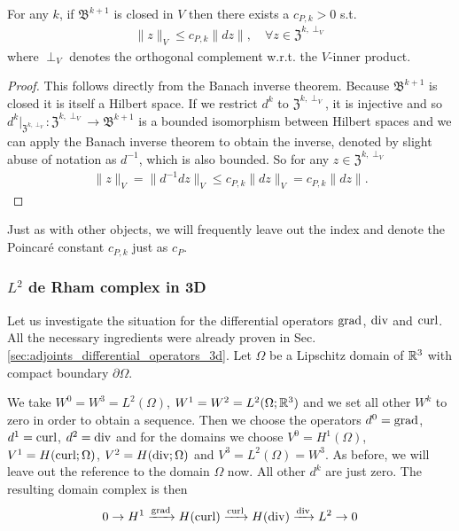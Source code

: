 \documentclass[../master_thesis.tex]{subfiles}
\begin{document}
\begin{theorem} \label{thm:poincare_inequality}
    For any $k$, if $\mathfrak{B}^{k+1}$ is closed in $V$ then there exists a 
    $c_{P,k}>0$ s.t. 
    \begin{align*}
        \lVert z \rVert _V \leq c_{P,k} \lVert dz \rVert, \quad \forall z \in \mathfrak{Z}^{k,\perp_V}
    \end{align*}
    where $\perp_V$ denotes the orthogonal complement w.r.t. the $V$-inner product.
\end{theorem}
\begin{proof}
    This follows directly from the Banach inverse theorem. Because $\mathfrak{B}^{k+1}$ is closed
    it is itself a Hilbert space. If we restrict $d^k$ to $\mathfrak{Z}^{k,\perp_V}$, it 
    is injective and so $d^k|_{\mathfrak{Z}^{k,\perp_V}}:\mathfrak{Z}^{k,\perp_V} 
    \rightarrow \mathfrak{B}^{k+1}$ is a bounded isomorphism between 
    Hilbert spaces and we can apply the Banach inverse theorem to obtain the inverse, 
    denoted by slight abuse of notation as $d^{-1}$, which is also bounded. So 
    for any $z \in \mathfrak{Z}^{k,\perp_V}$
    \begin{align*}
        \lVert z \rVert _V = \lVert d^{-1} dz \rVert _V  \leq c_{P,k} \lVert dz \rVert _V 
        = c_{P,k} \lVert dz \rVert.
    \end{align*}
\end{proof}
Just as with other objects, we will frequently leave out the index and denote the 
Poincaré constant $c_{P,k}$ just as $c_P$.

\subsubsection{$L^2$ de Rham complex in 3D} \label{sec:l2_de_rham_complex_in_3d}
Let us investigate the situation for the differential operators 
$\operatorname{grad}$, $\operatorname{div}$ and $\operatorname{curl}$. All the necessary ingredients were already 
proven in Sec.\,\ref{sec:adjoints_differential_operators_3d}. 
Let $\Omega$ be a Lipschitz domain of 
$\mathbb{R}^3$ with compact boundary $\partial \Omega$. %

We take $W^0 = W^3 = L^2(\Omega)$, $W^1 = W^2 = L^2(\Omega;\mathbb{R}^3)$ 
and we set all other $W^k$ to zero in order to obtain a sequence.
Then we choose the operators $d^0 = \operatorname{grad}$, $d^1 = \operatorname{curl}$, $d^2 = \operatorname{div}$ and
for the domains we choose $V^0 = H^1(\Omega)$, $V^1 = H(\operatorname{curl};\Omega)$, 
$V^2 = H(\operatorname{div};\Omega)$ and $V^3 = L^2(\Omega) = W^3$. 
As before, we will leave out the reference to the domain $\Omega$ now.
All other 
$d^k$ are just zero. The resulting domain complex is then
\begin{align}
    0 \rightarrow H^1 \xrightarrow{\grad} H(\curl)
        \xrightarrow{\curl} H(\diver) \xrightarrow{\diver} L^2 \rightarrow 0
    \label{eq:primal_de_rham_complex_3d}
\end{align}
\end{document}
